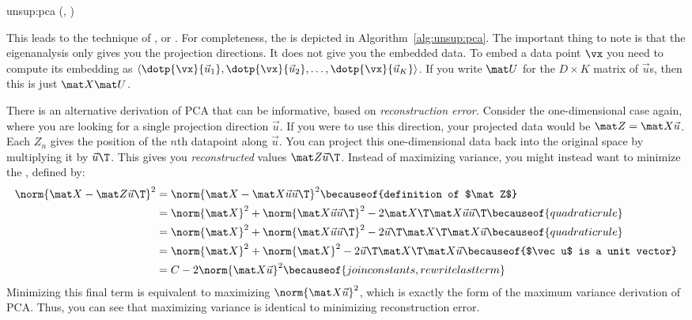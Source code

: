 \newalgorithm%
  {unsup:pca}%
  {(, )}
  {
}

This leads to the technique of , or .  For completeness, the is depicted in
Algorithm~\ref{alg:unsup:pca}.  The important thing to note is that
the eigenanalysis only gives you the projection directions.  It does
not give you the embedded data.  To embed a data point $\vx$ you need
to compute its embedding as $\langle \dotp{\vx}{\vec u_1},
\dotp{\vx}{\vec u_2}, \dots, \dotp{\vx}{\vec u_K} \rangle$.  If you
write $\mat U$ for the $D \times K$ matrix of $\vec u$s, then this is
just $\mat X \mat U$.

There is an alternative derivation of PCA that can be informative,
based on \emph{reconstruction error.}  Consider the one-dimensional
case again, where you are looking for a single projection direction
$\vec u$.  If you were to use this direction, your projected data
would be $\mat Z = \mat X \vec u$.  Each $Z_n$ gives the position of
the $n$th datapoint along $\vec u$.  You can project this
one-dimensional data back into the original space by multiplying it by
$\vec u\T$.  This gives you \emph{reconstructed} values $\mat Z \vec
u\T$.  Instead of maximizing variance, you might instead want to
minimize the , defined by:
%
\begin{align}
\norm{ \mat X - \mat Z\vec u\T}^2
&= \norm{ \mat X - \mat X \vec u \vec u\T }^2
\becauseof{definition of $\mat Z$}\\
&= \norm{\mat X}^2
 + \norm{\mat X \vec u \vec u\T}^2
 - 2 \mat X\T \mat X \vec u \vec u\T
\becauseof{quadratic rule}\\
&= \norm{\mat X}^2
 + \norm{\mat X \vec u \vec u\T}^2
 - 2 \vec u\T\mat X\T \mat X \vec u
\becauseof{quadratic rule}\\
&= \norm{\mat X}^2
 + \norm{\mat X}^2
 - 2 \vec u\T\mat X\T \mat X \vec u
\becauseof{$\vec u$ is a unit vector} \\
&= C - 2 \norm{\mat X \vec u}^2
\becauseof{join constants, rewrite last term}
\end{align}
%
Minimizing this final term is equivalent to maximizing $\norm{\mat
  X\vec u}^2$, which is exactly the form of the maximum variance
derivation of PCA.  Thus, you can see that maximizing variance is
identical to minimizing reconstruction error.

